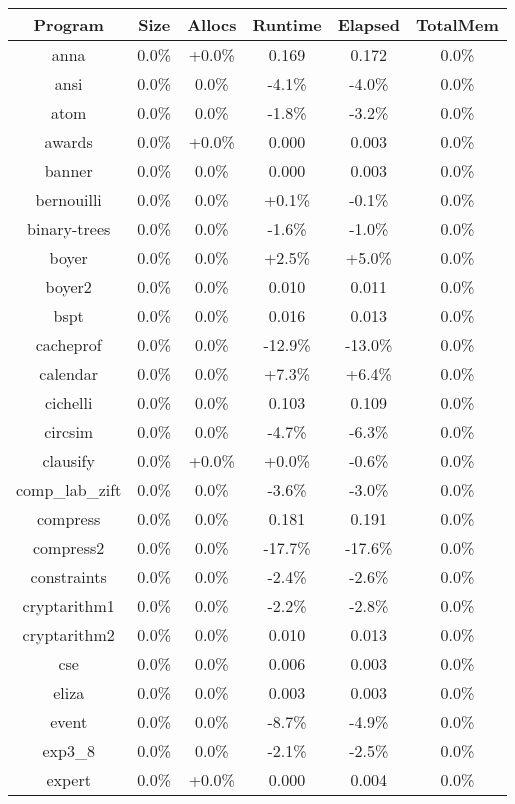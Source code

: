 \begin{tabular}{ c c c c c c }
Program & Size & Allocs & Runtime & Elapsed & TotalMem\\
\hline
anna &  0.0\% & +0.0\% & 0.169 & 0.172 &  0.0\%\\
ansi &  0.0\% &  0.0\% & -4.1\% & -4.0\% &  0.0\%\\
atom &  0.0\% &  0.0\% & -1.8\% & -3.2\% &  0.0\%\\
awards &  0.0\% & +0.0\% & 0.000 & 0.003 &  0.0\%\\
banner &  0.0\% &  0.0\% & 0.000 & 0.003 &  0.0\%\\
bernouilli &  0.0\% &  0.0\% & +0.1\% & -0.1\% &  0.0\%\\
binary-trees &  0.0\% &  0.0\% & -1.6\% & -1.0\% &  0.0\%\\
boyer &  0.0\% &  0.0\% & +2.5\% & +5.0\% &  0.0\%\\
boyer2 &  0.0\% &  0.0\% & 0.010 & 0.011 &  0.0\%\\
bspt &  0.0\% &  0.0\% & 0.016 & 0.013 &  0.0\%\\
cacheprof &  0.0\% &  0.0\% & -12.9\% & -13.0\% &  0.0\%\\
calendar &  0.0\% &  0.0\% & +7.3\% & +6.4\% &  0.0\%\\
cichelli &  0.0\% &  0.0\% & 0.103 & 0.109 &  0.0\%\\
circsim &  0.0\% &  0.0\% & -4.7\% & -6.3\% &  0.0\%\\
clausify &  0.0\% & +0.0\% & +0.0\% & -0.6\% &  0.0\%\\
comp\_lab\_zift &  0.0\% &  0.0\% & -3.6\% & -3.0\% &  0.0\%\\
compress &  0.0\% &  0.0\% & 0.181 & 0.191 &  0.0\%\\
compress2 &  0.0\% &  0.0\% & -17.7\% & -17.6\% &  0.0\%\\
constraints &  0.0\% &  0.0\% & -2.4\% & -2.6\% &  0.0\%\\
cryptarithm1 &  0.0\% &  0.0\% & -2.2\% & -2.8\% &  0.0\%\\
cryptarithm2 &  0.0\% &  0.0\% & 0.010 & 0.013 &  0.0\%\\
cse &  0.0\% &  0.0\% & 0.006 & 0.003 &  0.0\%\\
eliza &  0.0\% &  0.0\% & 0.003 & 0.003 &  0.0\%\\
event &  0.0\% &  0.0\% & -8.7\% & -4.9\% &  0.0\%\\
exp3\_8 &  0.0\% &  0.0\% & -2.1\% & -2.5\% &  0.0\%\\
expert &  0.0\% & +0.0\% & 0.000 & 0.004 &  0.0\%\\

\end{tabular}
